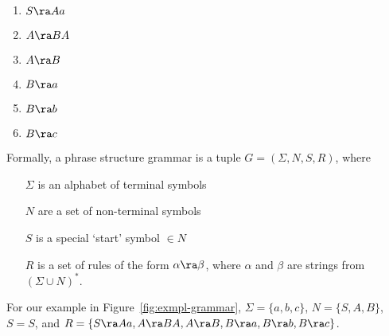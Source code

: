 \begin{marginfigure}
  \begin{tcolorbox}
    \begin{enumerate}
      \item $ S \ra A a$
      \item $ A \ra B A$
      \item $ A \ra B$
      \item $ B \ra a$
      \item $ B \ra b$
      \item $ B \ra c$
    \end{enumerate}
  \end{tcolorbox}
  \caption{\label{fig:exmpl-grammar}%
    An example grammar producing string over $\{a, b, c\}$
    that end with symbol $a$.
    A common short-hand for writing last three rules is a single rule 
    of the form `$B \ra a | b | c$'.
  }
\end{marginfigure}

Formally,
a phrase structure grammar is a tuple
$G = (\Sigma, N, S, R)$, where
  \begin{itemize}
    \item[$\Sigma$] is an alphabet of terminal symbols
    \item[$N$] are a set of non-terminal symbols 
    \item[$S$] is a special `start' symbol $\in N$
    \item[$R$] is a set of rules of the form $\alpha \ra \beta$,
      where  $\alpha$ and $\beta$ are strings from $(\Sigma \cup N)^{*}$.
  \end{itemize}

For our example in Figure~\ref{fig:exmpl-grammar},
$\Sigma = \{a, b, c\}$, $N = \{S, A, B\}$, $S = S$,
and $R = \{ S \ra A a, A \ra B A, A \ra B,
      B \ra a, B \ra b, B \ra c\}$.


